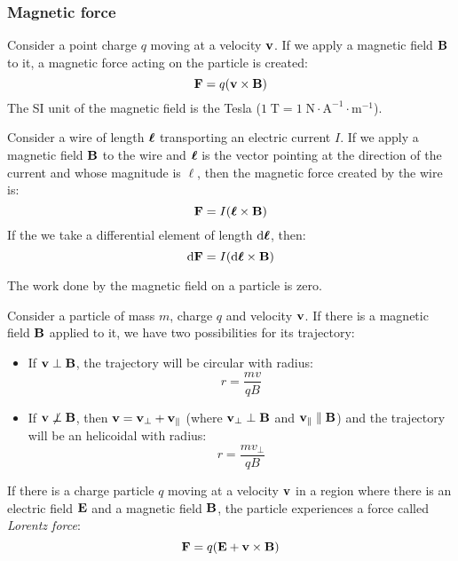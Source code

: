\documentclass[../../../main.tex]{subfiles}
\begin{document}
\begin{multicols}{2}
  \subsubsection*{Magnetic force}
  \begin{prop}
    Consider a point charge $q$ moving at a velocity $\vb{v}$. If we apply a magnetic field $\vb{B}$ to it, a magnetic force acting on the particle is created: $$\vb{F}=q(\vb{v}\times\vb{B})$$ The SI unit of the magnetic field is the Tesla ($1\;\text{T}=1\;\text{N}\cdot\text{A}^{-1}\cdot\text{m}^{-1}$).
  \end{prop}
  \begin{prop}
    Consider a wire of length $\vb*{\ell}$ transporting an electric current $I$. If we apply a magnetic field $\vb{B}$ to the wire and $\vb*{\ell}$ is the vector pointing at the direction of the current and whose magnitude is $\ell$, then the magnetic force created by the wire is: $$\vb{F}=I(\vb*{\ell}\times\vb{B})$$ If the we take a differential element of length $\dd\vb*{\ell}$, then: $$\dd \vb{F}=I(\dd\vb*{\ell}\times\vb{B})$$
  \end{prop}
  \begin{lemma}
    The work done by the magnetic field on a particle is zero.
  \end{lemma}
  \begin{prop}
    Consider a particle of mass $m$, charge $q$ and velocity $\vb{v}$. If there is a magnetic field $\vb{B}$ applied to it, we have two possibilities for its trajectory:
    \begin{itemize}
      \item If $\vb{v}\perp\vb{B}$, the trajectory will be circular with radius: $$r=\frac{mv}{qB}$$
      \item If $\vb{v}\not\perp\vb{B}$, then $\vb{v}=\vb{v}_\perp+\vb{v}_\parallel$ (where $\vb{v}_\perp\perp\vb{B}$ and $\vb{v}_\parallel\parallel\vb{B}$) and the trajectory will be an helicoidal with radius: $$r=\frac{mv_\perp}{qB}$$
    \end{itemize}
  \end{prop}
  \begin{prop}
    If there is a charge particle $q$ moving at a velocity $\vb{v}$ in a region where there is an electric field $\vb{E}$ and a magnetic field $\vb{B}$, the particle experiences a force called \textit{Lorentz force}: $$\vb{F}=q(\vb{E}+\vb{v}\times\vb{B})$$
  \end{prop}

\end{multicols}
\end{document}
